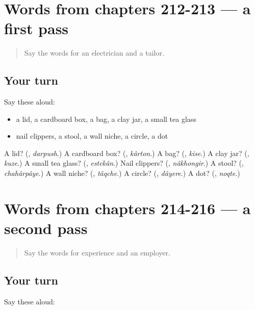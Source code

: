 \section[(dialogue)]{Words from chapters 212-213 — a first pass}

\label{lesson:FA-R216-first-pass-words-from-chapters-212-213}



\begin{quote}
Say the words for an electrician and a tailor.
\end{quote}

\subsection*{Your turn}
Say these aloud:

\begin{itemize}
\raggedright
  \item a lid, a cardboard box, a bag, a clay jar, a small tea glass
  \item nail clippers, a stool, a wall niche, a circle, a dot
\end{itemize}

\begin{tcolorbox}[breakable,colback=teal!4,colframe=teal!35!black,title={Before you move on}]
A lid? (\textbf{}, \emph{darpush}.) A cardboard box? (\textbf{}, \emph{kârton}.) A bag? (\textbf{}, \emph{kise}.) A clay jar? (\textbf{}, \emph{kuze}.) A small tea glass? (\textbf{}, \emph{estekân}.) Nail clippers? (\textbf{}, \emph{nâkhongir}.) A stool? (\textbf{}, \emph{chahârpâye}.) A wall niche? (\textbf{}, \emph{tâqche}.) A circle? (\textbf{}, \emph{dâyere}.) A dot? (\textbf{}, \emph{noqte}.)
\end{tcolorbox}
\section[(dialogue)]{Words from chapters 214-216 — a second pass}

\label{lesson:FA-R216-second-pass-words-from-chapters-214-216}



\begin{quote}
Say the words for experience and an employer.
\end{quote}

\subsection*{Your turn}
Say these aloud:

